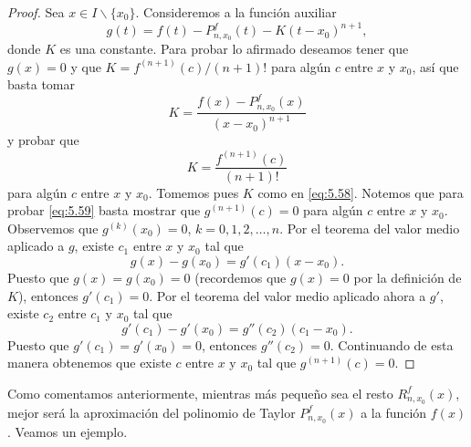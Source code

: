\documentclass[12pt,a4paper]{book}
\begin{document}
    \begin{proof}
        Sea $x\in I\backslash\{x_{0}\}$. Consideremos a la función auxiliar
        \begin{equation*}
            g(t)=f(t)-P^{f}_{n,x_{0}}(t)-K(t-x_{0})^{n+1},
        \end{equation*}
        donde $K$ es una constante. Para probar lo afirmado deseamos tener que
        $g(x)=0$ y que $K=f^{(n+1)}(c)/(n+1)!$ para algún $c$ entre $x$ y $x_{0}$, así
        que basta tomar
        \begin{equation}\label{eq:5.58}
            K=\frac{f(x)-P^{f}_{n,x_{0}}(x)}{(x-x_{0})^{n+1}}
        \end{equation}
        y probar que
        \begin{equation}\label{eq:5.59}
            K=\frac{f^{(n+1)}(c)}{(n+1)!}
        \end{equation}
        para algún $c$ entre $x$ y $x_{0}$. Tomemos pues $K$ como en \eqref{eq:5.58}. Notemos que
        para probar \eqref{eq:5.59} basta mostrar que $g^{(n+1)}(c)=0$ para algún $c$ entre $x$ y
        $x_{0}$. Observemos que $g^{(k)}(x_{0})=0$, $k=0,1,2,\ldots,n$. Por el teorema del valor
        medio aplicado a $g$, existe $c_{1}$ entre $x$ y $x_{0}$ tal que
        \begin{equation*}
            g(x)-g(x_{0})=g'(c_{1})(x-x_{0}).
        \end{equation*}
        Puesto que $g(x)=g(x_{0})=0$ (recordemos que $g(x)=0$ por la definición de
        $K$), entonces $g'(c_{1})=0$. Por el teorema del valor medio aplicado ahora a $g'$,
        existe $c_{2}$ entre $c_{1}$ y $x_{0}$ tal que
        \begin{equation*}
            g'(c_{1})-g'(x_{0})=g''(c_{2})(c_{1}-x_{0}).
        \end{equation*}
        Puesto que $g'(c_{1})=g'(x_{0})=0$, entonces $g''(c_{2})=0$. Continuando de esta
        manera obtenemos que existe $c$ entre $x$ y $x_{0}$ tal que $g^{(n+1)}(c)=0$.
    \end{proof}

    Como comentamos anteriormente, mientras más pequeño sea el resto
    $R^{f}_{n,x_{0}}(x)$, mejor será la aproximación del polinomio de Taylor $P^{f}_{n,x_{0}}(x)$ a
    la función $f(x)$. Veamos un ejemplo.
\end{document}

